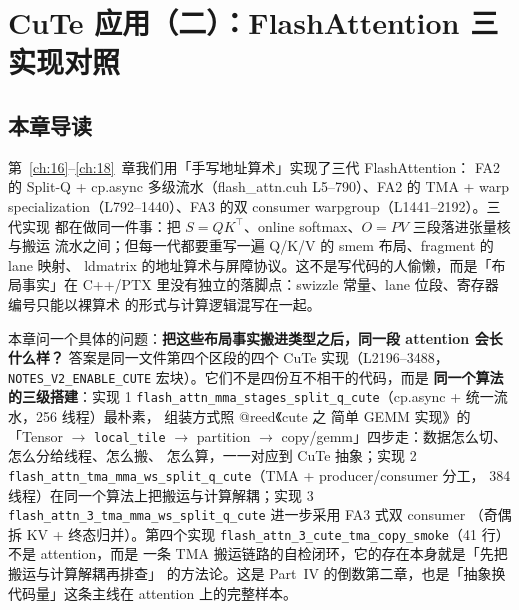\makeatletter
\providecommand{\urlchbrk}[1]{\@tfor\next:=#1\do{\next\allowbreak}}
\makeatother
\providecommand{\url}[1]{{\ttfamily\urlchbrk{#1}}}
\chapter{CuTe 应用（二）：FlashAttention 三实现对照}\label{ch:25}

\section{本章导读}

第~\ref{ch:16}--\ref{ch:18}~章我们用「手写地址算术」实现了三代 FlashAttention：
FA2 的 Split-Q + cp.async 多级流水（flash\_attn.cuh L5--790）、FA2 的 TMA + warp
specialization（L792--1440）、FA3 的双 consumer warpgroup（L1441--2192）。三代实现
都在做同一件事：把 $S=QK^\top$、online softmax、$O=PV$ 三段落进张量核与搬运
流水之间；但每一代都要重写一遍 Q/K/V 的 smem 布局、fragment 的 lane 映射、
ldmatrix 的地址算术与屏障协议。这不是写代码的人偷懒，而是「布局事实」在
C++/PTX 里没有独立的落脚点：swizzle 常量、lane 位段、寄存器编号只能以裸算术
的形式与计算逻辑混写在一起。

本章问一个具体的问题：\textbf{把这些布局事实搬进类型之后，同一段 attention
会长什么样？} 答案是同一文件第四个区段的四个 CuTe 实现（L2196--3488，
\texttt{NOTES\_\allowbreak{}V2\_\allowbreak{}ENABLE\_\allowbreak{}CUTE} 宏块）。它们不是四份互不相干的代码，而是
\textbf{同一个算法的三级搭建}：实现 1
\texttt{flash\_\allowbreak{}attn\_\allowbreak{}mma\_\allowbreak{}stages\_\allowbreak{}split\_\allowbreak{}q\_\allowbreak{}cute}（cp.async + 统一流水，256 线程）最朴素，
组装方式照 @reed《cute 之 简单 GEMM 实现》的「Tensor $\to$ \texttt{local\_tile}
$\to$ partition $\to$ copy/gemm」四步走：数据怎么切、怎么分给线程、怎么搬、
怎么算，一一对应到 CuTe 抽象；实现 2
\texttt{flash\_\allowbreak{}attn\_\allowbreak{}tma\_\allowbreak{}mma\_\allowbreak{}ws\_\allowbreak{}split\_\allowbreak{}q\_\allowbreak{}cute}（TMA + producer/consumer 分工，
384 线程）在同一个算法上把搬运与计算解耦；实现 3
\texttt{flash\_\allowbreak{}attn\_\allowbreak{}3\_\allowbreak{}tma\_\allowbreak{}mma\_\allowbreak{}ws\_\allowbreak{}split\_\allowbreak{}q\_\allowbreak{}cute} 进一步采用 FA3 式双 consumer
（奇偶拆 KV + 终态归并）。第四个实现
\texttt{flash\_\allowbreak{}attn\_\allowbreak{}3\_\allowbreak{}cute\_\allowbreak{}tma\_\allowbreak{}copy\_\allowbreak{}smoke}（41 行）不是 attention，而是
一条 TMA 搬运链路的自检闭环，它的存在本身就是「先把搬运与计算解耦再排查」
的方法论。这是 Part~IV 的倒数第二章，也是「抽象换代码量」这条主线在
attention 上的完整样本。

